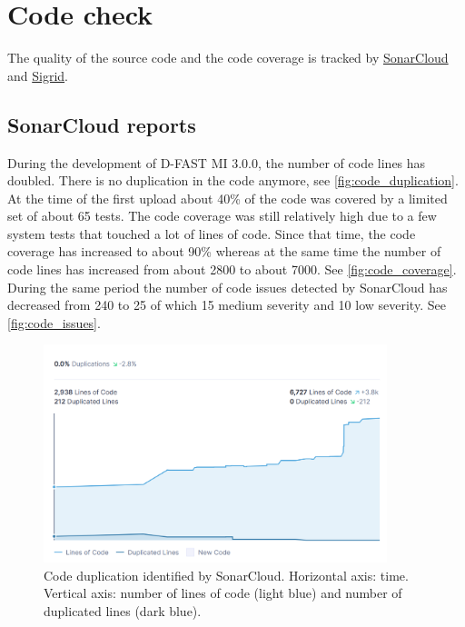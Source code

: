 \section{Code check}
The quality of the \dfastmi source code and the code coverage is tracked by \href{https://sonarcloud.io/project/overview?id=Deltares_D-FAST_Morphological_Impact}{SonarCloud} and \href{https://sigrid-says.com/deltares/dfast-mi/-/overview}{Sigrid}.

\subsection{SonarCloud reports}
During the development of D-FAST MI 3.0.0, the number of code lines has doubled.
There is no duplication in the code anymore, see \autoref{fig:code_duplication}.
At the time of the first upload about 40\% of the code was covered by a limited set of about 65 tests.
The code coverage was still relatively high due to a few system tests that touched a lot of lines of code.
Since that time, the code coverage has increased to about 90\% whereas at the same time the number of code lines has increased from about 2800 to about 7000.
See \autoref{fig:code_coverage}.
During the same period the number of code issues detected by SonarCloud has decreased from 240 to 25 of which 15 medium severity and 10 low severity.
See \autoref{fig:code_issues}.

\begin{figure}
\center
\includegraphics[width=10cm]{figures/code_duplication.png}
\caption{Code duplication identified by SonarCloud. Horizontal axis: time. Vertical axis: number of lines of code (light blue) and number of duplicated lines (dark blue).}
\label{fig:code_duplication}
\end{figure}

